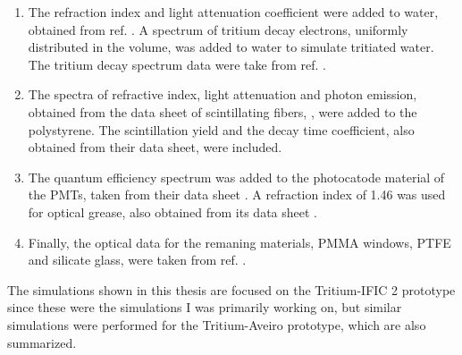 \begin{enumerate}
%
\item{} The refraction index and light attenuation coefficient were added to water, obtained from ref. \cite{WaterPropertiesSimulation}. A spectrum of tritium decay electrons, uniformly distributed in the volume, was added to water to simulate tritiated water. The tritium decay spectrum data were take from ref. \cite{TritiumEmissionSpectrum}.

\item{} The spectra of refractive index, light attenuation and photon emission, obtained from the data sheet of scintillating fibers, \cite{DataSheetBCF12Fiber}, were added to the polystyrene. The scintillation yield and the decay time coefficient, also obtained from their data sheet, were included.

\item{} The quantum efficiency spectrum was added to the photocatode material of the PMTs, taken from their data sheet \cite{DataSheetPMTs}. A refraction index of 1.46 was used for optical grease, also obtained from its data sheet \cite{OpticalGrease}.

\item{} Finally, the optical data for the remaning materials, PMMA windows, PTFE and silicate glass, were taken from ref. \cite{NEMODataSimulation}.

\end{enumerate} 

The simulations shown in this thesis are focused on the Tritium-IFIC 2 prototype since these were the simulations I was primarily working on, but similar simulations were performed for the Tritium-Aveiro prototype, which are also summarized.